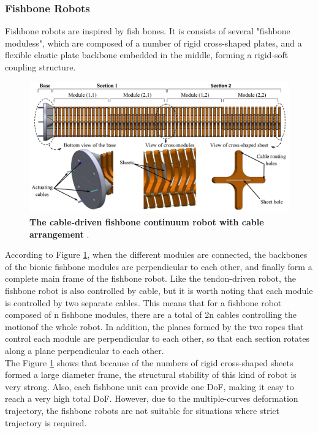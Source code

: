 \subsubsection{Fishbone Robots}
Fishbone robots are inspired by fish bones. It is consists of several "fishbone moduless", which are 
composed of a number of rigid cross-shaped plates, and a flexible elastic plate backbone embedded in the middle, 
forming a rigid-soft coupling structure\cite{fishboneCR}. 
\begin{figure}[H] %
    \centering 
    \captionsetup{labelsep=colon}
    \includegraphics[width=.9\textwidth]{Image/LR/fishbone_CR_amouri2023bio.PNG} 
    \caption[The cable-driven fishbone continuum robot]
    {\centering \textbf{The cable-driven fishbone continuum robot with cable arrangement} \cite{amouri2023bio}.}
    \label{fig:fishboneCR_2023bio}
\end{figure}
\noindent According to Figure \ref{fig:fishboneCR_2023bio}, when the different modules are connected, the backbones of the bionic 
fishbone modules are perpendicular to each other, and finally form a complete main frame of the fishbone robot. Like the 
tendon-driven robot, the fishbone robot is also controlled by cable, but it is worth noting that each module is controlled 
by two separate cables. This means that for a fishbone robot composed of n fishbone modules, there are a total of 2n cables 
controlling the motionof the whole robot. In addition, the planes formed by the two ropes that control each module are 
perpendicular to each other, so that each section rotates along a plane perpendicular to each other. \\
The Figure \ref{fig:fishboneCR_2023bio} shows that because of the numbers of rigid cross-shaped sheets formed a large diameter 
frame, the structural stability of this kind of robot is very strong. Also, each fishbone unit can provide one DoF, making it 
easy to reach a very high total DoF. However, due to the multiple-curves deformation trajectory, the fishbone robots are not 
suitable for situations where strict trajectory is required\cite{fishboneCR}. 
